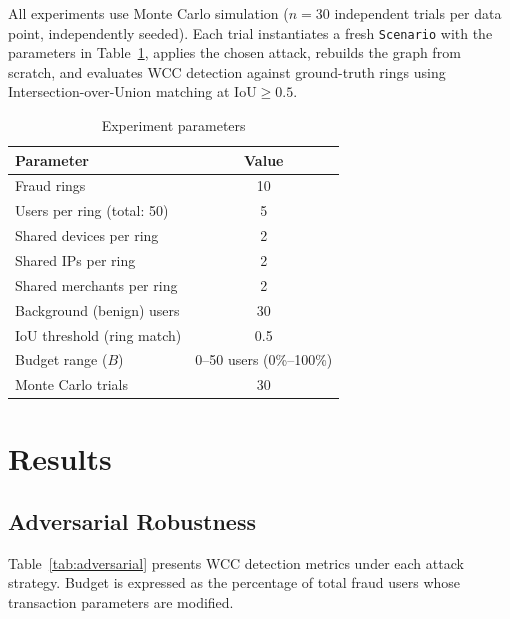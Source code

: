\documentclass[sigconf,nonacm]{acmart}
\newcommand{\wcc}{\textsc{WCC}\xspace}
\begin{document}
All experiments use Monte Carlo simulation ($n = 30$ independent trials per
data point, independently seeded).  Each trial instantiates a fresh
\texttt{Scenario} with the parameters in Table~\ref{tab:setup}, applies the
chosen attack, rebuilds the graph from scratch, and evaluates \wcc detection
against ground-truth rings using Intersection-over-Union matching at
$\mathrm{IoU} \geq 0.5$.

\begin{table}[h]
\caption{Experiment parameters}
\label{tab:setup}
\centering
\begin{tabular}{lc}
\toprule
Parameter & Value \\
\midrule
Fraud rings & 10 \\
Users per ring (total: 50) & 5 \\
Shared devices per ring & 2 \\
Shared IPs per ring & 2 \\
Shared merchants per ring & 2 \\
Background (benign) users & 30 \\
IoU threshold (ring match) & 0.5 \\
Budget range ($B$) & 0--50 users (0\%--100\%) \\
Monte Carlo trials & 30 \\
\bottomrule
\end{tabular}
\end{table}

\section{Results}

\subsection{Adversarial Robustness}

Table~\ref{tab:adversarial} presents \wcc detection metrics under each
attack strategy.  Budget is expressed as the percentage of total fraud users
whose transaction parameters are modified.
\end{document}

